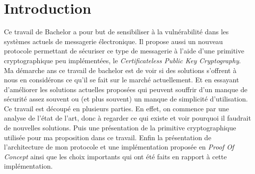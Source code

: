 \chapter{Introduction}
\label{ch:intro}

Ce travail de Bachelor a pour but de sensibiliser à la vulnérabilité dans les systèmes actuels de messagerie électronique. Il propose aussi un nouveau protocole permettant de sécuriser ce type de messagerie à l'aide d'une primitive cryptographique peu implémentées, le \textit{Certificateless Public Key Cryptography}. Ma démarche ans ce travail de bachelor est de voir si des solutions s'offrent à nous en considérons ce qu'il se fait sur le marché actuellement. Et en essayant d'améliorer les solutions actuelles proposées qui peuvent souffrir d'un manque de sécurité assez souvent ou (et plus souvent) un manque de simplicité d'utilisation.\\
Ce travail est découpé en plusieurs parties. En effet, on commence par une analyse de l'état de l'art, donc à regarder ce qui existe et voir pourquoi il faudrait de nouvelles solutions. Puis une présentation de la primitive cryptographique utilisée pour ma proposition dans ce travail. Enfin la présentation de l'architecture de mon protocole et une implémentation proposée en \textit{Proof Of Concept} ainsi que les choix importants qui ont été faits en rapport à cette implémentation.